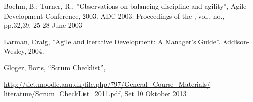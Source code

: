 \begin{thebibliography}{9}

  Boehm, B.; Turner, R., ''Observations on balancing discipline and agility'', Agile Development Conference, 2003.
  ADC 2003. Proceedings of the , vol., no., pp.32,39, 25-28 June 2003
  
Larman, Craig, ''Agile and Iterative Development: A Manager's Guide''.
Addison-Wesley, 2004.

Gloger, Boris, ``Scrum Checklist'', 

\url{http://sict.moodle.aau.dk/file.php/797/General\_Course\_Materials/
literature/Scrum\_CheckList\_2011.pdf}, Set 10 Oktober 2013
\end{thebibliography}

